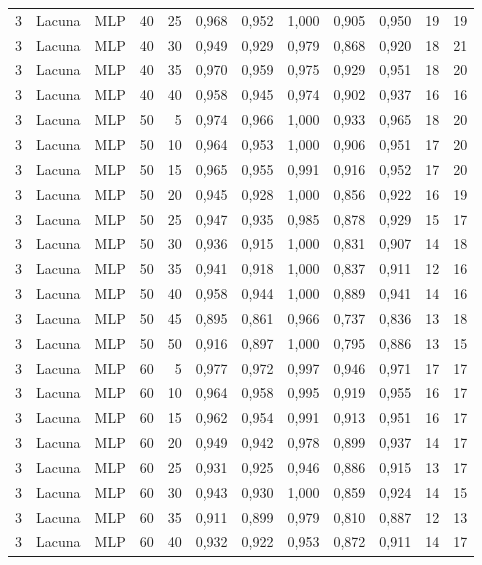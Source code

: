 \begin{longtable}{ccclrrrrrrrr}
3 & Lacuna & MLP & 40 & 25 & 0,968 & 0,952 & 1,000 & 0,905 & 0,950 & 19 & 19 \\
3 & Lacuna & MLP & 40 & 30 & 0,949 & 0,929 & 0,979 & 0,868 & 0,920 & 18 & 21 \\
3 & Lacuna & MLP & 40 & 35 & 0,970 & 0,959 & 0,975 & 0,929 & 0,951 & 18 & 20 \\
3 & Lacuna & MLP & 40 & 40 & 0,958 & 0,945 & 0,974 & 0,902 & 0,937 & 16 & 16 \\
3 & Lacuna & MLP & 50 & 5 & 0,974 & 0,966 & 1,000 & 0,933 & 0,965 & 18 & 20 \\
3 & Lacuna & MLP & 50 & 10 & 0,964 & 0,953 & 1,000 & 0,906 & 0,951 & 17 & 20 \\
3 & Lacuna & MLP & 50 & 15 & 0,965 & 0,955 & 0,991 & 0,916 & 0,952 & 17 & 20 \\
3 & Lacuna & MLP & 50 & 20 & 0,945 & 0,928 & 1,000 & 0,856 & 0,922 & 16 & 19 \\
3 & Lacuna & MLP & 50 & 25 & 0,947 & 0,935 & 0,985 & 0,878 & 0,929 & 15 & 17 \\
3 & Lacuna & MLP & 50 & 30 & 0,936 & 0,915 & 1,000 & 0,831 & 0,907 & 14 & 18 \\
3 & Lacuna & MLP & 50 & 35 & 0,941 & 0,918 & 1,000 & 0,837 & 0,911 & 12 & 16 \\
3 & Lacuna & MLP & 50 & 40 & 0,958 & 0,944 & 1,000 & 0,889 & 0,941 & 14 & 16 \\
3 & Lacuna & MLP & 50 & 45 & 0,895 & 0,861 & 0,966 & 0,737 & 0,836 & 13 & 18 \\
3 & Lacuna & MLP & 50 & 50 & 0,916 & 0,897 & 1,000 & 0,795 & 0,886 & 13 & 15 \\
3 & Lacuna & MLP & 60 & 5 & 0,977 & 0,972 & 0,997 & 0,946 & 0,971 & 17 & 17 \\
3 & Lacuna & MLP & 60 & 10 & 0,964 & 0,958 & 0,995 & 0,919 & 0,955 & 16 & 17 \\
3 & Lacuna & MLP & 60 & 15 & 0,962 & 0,954 & 0,991 & 0,913 & 0,951 & 16 & 17 \\
3 & Lacuna & MLP & 60 & 20 & 0,949 & 0,942 & 0,978 & 0,899 & 0,937 & 14 & 17 \\
3 & Lacuna & MLP & 60 & 25 & 0,931 & 0,925 & 0,946 & 0,886 & 0,915 & 13 & 17 \\
3 & Lacuna & MLP & 60 & 30 & 0,943 & 0,930 & 1,000 & 0,859 & 0,924 & 14 & 15 \\
3 & Lacuna & MLP & 60 & 35 & 0,911 & 0,899 & 0,979 & 0,810 & 0,887 & 12 & 13 \\
3 & Lacuna & MLP & 60 & 40 & 0,932 & 0,922 & 0,953 & 0,872 & 0,911 & 14 & 17 \\

\end{longtable}

